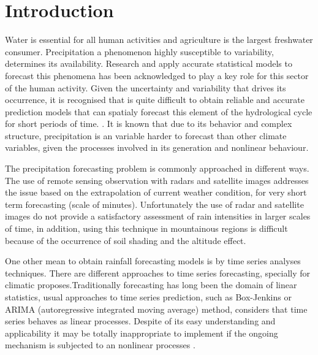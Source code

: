 \chapter{Introduction} 
\label{cap:ini}
\vspace{-2cm}


Water is essential for all human activities and agriculture is the largest freshwater consumer. Precipitation a phenomenon highly susceptible to variability, determines its availability\cite{calzadilla2013climate}. Research and apply accurate statistical models to forecast this phenomena has been acknowledged to play a key role for this sector of the human activity\cite{toth2000comparison}. Given the uncertainty and variability that drives its occurrence, it is recognised that is quite difficult to obtain reliable and accurate prediction models that can spatialy forecast this element of the hydrological cycle for short periods of time. \cite{brath1997role}. It is known that due to its behavior and complex structure, precipitation is an variable harder to forecast than other climate variables, given the processes involved in its generation and nonlinear behaviour\cite{jha2018evaluation}.

The precipitation forecasting problem is commonly approached in different ways. The use of remote sensing observation with radars and satellite images addresses the issue based on the extrapolation of current weather condition, for very short term forecasting (scale of minutes). Unfortunately the use of radar and satellite images do not provide a satisfactory assessment of rain intensities in larger scales of time, in addition, using this technique in mountainous regions is difficult because of the occurrence of soil shading and the altitude effect\cite{toth2000comparison}. 

One other mean to obtain rainfall forecasting models is by time series analyses techniques. There are different approaches to time series forecasting, specially for climatic proposes.Traditionally forecasting has long been the domain of linear statistics, usual approaches to time series prediction, such as Box-Jenkins\cite{box1976time} or ARIMA (autoregressive integrated moving average) method\cite{pankratz1983forecasting}, considers that time series behaves as linear processes. Despite of its easy understanding and applicability it may be totally inappropriate to implement if the ongoing mechanism is subjected to an nonlinear processes \cite{zhang2003time}. 

